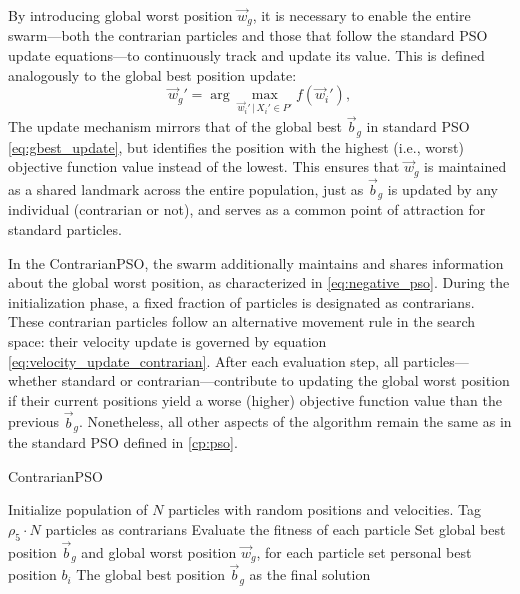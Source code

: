 {By introducing global worst position  $\vec{w}_g$, it is necessary to enable the entire swarm---both the contrarian particles and those that follow the standard PSO update equations---to continuously track and update its value. This is defined analogously to the global best position update:
\begin{equation}
    \vec{w}_g' = \arg\max_{\vec{w}_i'\,|\, X_i' \in P'} f(\vec{w}_i'),
    \label{eq:gworst_update}
\end{equation}
The update mechanism mirrors that of the global best $\vec{b}_g$ in standard PSO \eqref{eq:gbest_update}, but identifies the position with the highest (i.e., worst) objective function value instead of the lowest. This ensures that $\vec{w}_g$ is maintained as a shared landmark across the entire population, just as $\vec{b}_g$ is updated by any individual (contrarian or not), and serves as a common point of attraction for standard particles.

In the ContrarianPSO, the swarm additionally maintains and shares information about the global worst position, as characterized in \eqref{eq:negative_pso}. During the initialization phase, a fixed fraction of particles is designated as contrarians. These contrarian particles follow an alternative movement rule in the search space: their velocity update is governed by equation \eqref{eq:velocity_update_contrarian}. After each evaluation step, all particles—whether standard or contrarian—contribute to updating the global worst position if their current positions yield a worse (higher) objective function value than the previous $\vec{b}_g$. Nonetheless, all other aspects of the algorithm remain the same as in the standard PSO defined in \autoref{cp:pso}.


\begin{algorithm}[H]
\caption{ContrarianPSO}\label{alg:contrarian}
Initialize population of \(N\) particles with random positions and velocities. Tag \(\rho_5 \cdot N\) particles as contrarians\;
Evaluate the fitness of each particle\;
Set global best position \(\vec{b}_g\) and global worst position \(\vec{w}_g\), for each particle set personal best position \(b_i\)\;
\Return The global best position \(\vec{b}_g\) as the final solution\;
\end{algorithm}

}
